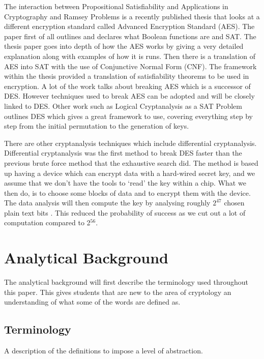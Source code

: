 \documentclass[11pt,a4paper]{report}
\begin{document}
The interaction between Propositional Satisfiability and Applications in Cryptography and Ramsey Problems \cite{Gwynne2010Interaction} is a recently published thesis that looks at a different encryption standard called Advanced Encryption Standard (AES). The paper first of all outlines and declares what Boolean functions are and SAT. The thesis paper goes into depth of how the AES works by giving a very detailed explanation along with examples of how it is runs. Then there is a translation of AES into SAT with the use of Conjunctive Normal Form (CNF). The framework within the thesis provided a translation of satisfiability theorems to be used in encryption. A lot of the work talks about breaking AES which is a successor of DES. However techniques used to break AES can be adopted and will be closely linked to DES. 
Other work such as Logical Cryptanalysis as a SAT Problem \cite{Fabio2000LogicalSAT} outlines DES which gives a great framework to use, covering everything step by step from the initial permutation to the generation of keys.

There are other cryptanalysis techniques which include differential cryptanalysis. Differential cryptanalysis was the first method to break DES faster than the previous brute force method that the exhaustive search did. The method is based up having a device which can encrypt data with a hard-wired secret key, and we assume that we don't have the tools to `read' the key within a chip. What we then do, is to choose some blocks of data and to encrypt them with the device. The data analysis will then compute the key by analysing roughly $2^{47}$ chosen plain text bits \cite{Junod2013LASEC}. This reduced  the probability of success as we cut out a lot of computation compared to 2$^{56}$. 




\chapter{Analytical Background}
\label{cha:AnBack}

The analytical background will first describe the terminology used throughout this paper. This gives students that are new to the area of cryptology an understanding of what some of the words are defined as.


\section{Terminology}
\label{sec:Term}
A description of the definitions to impose a level of abstraction.
\end{document}
